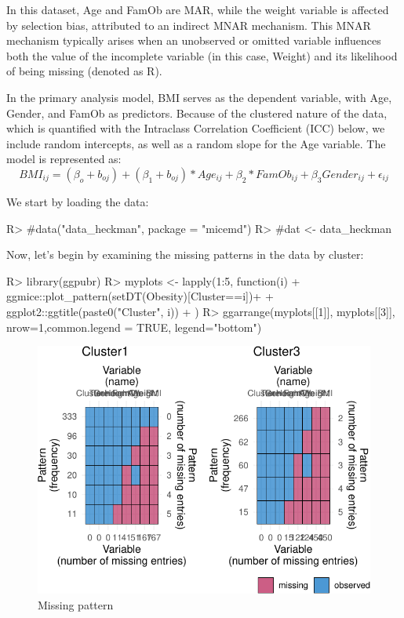 \documentclass[
]{jss}
\begin{document}
In this dataset, Age and FamOb are MAR, while the weight variable is
affected by selection bias, attributed to an indirect MNAR mechanism.
This MNAR mechanism typically arises when an unobserved or omitted
variable influences both the value of the incomplete variable (in this
case, Weight) and its likelihood of being missing (denoted as R).

In the primary analysis model, BMI serves as the dependent variable,
with Age, Gender, and FamOb as predictors. Because of the clustered
nature of the data, which is quantified with the Intraclass Correlation
Coefficient (ICC) below, we include random intercepts, as well as a
random slope for the Age variable. The model is represented as:
\begin{equation}
\label{eqn:main}
BMI_{ij}= (\beta_{o}+ b_{oj} ) + (\beta_{1}+ b_{oj})* Age_{ij} + \beta_{2}*FamOb_{ij}+ \beta_{3}Gender_{ij} + \epsilon_{ij}
\end{equation}

We start by loading the data:

\begin{CodeChunk}
\begin{CodeInput}
R> #data("data_heckman", package = "micemd")
R> #dat <- data_heckman
\end{CodeInput}
\end{CodeChunk}

Now, let's begin by examining the missing patterns in the data by
cluster:

\begin{CodeChunk}
\begin{CodeInput}
R> library(ggpubr)
R> myplots <- lapply(1:5, function(i) {
+   ggmice::plot_pattern(setDT(Obesity)[Cluster==i])+
+   ggplot2::ggtitle(paste0("Cluster", i))
+  })
R> ggarrange(myplots[[1]], myplots[[3]], nrow=1,common.legend = TRUE, legend="bottom")
\end{CodeInput}
\begin{figure}

{\centering \includegraphics[width=0.7\linewidth]{Imputation_of_Incomplete_Multilevel_Data_files/figure-latex/obesity-md-1} 

}

\caption[Missing pattern]{Missing pattern}\label{fig:obesity-md}
\end{figure}
\end{CodeChunk}
\end{document}
